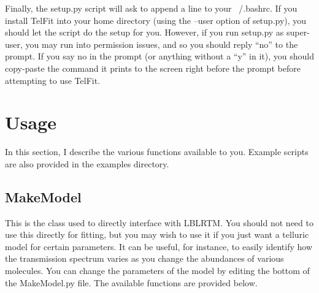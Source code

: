 \documentclass{article}
\begin{document}
Finally, the setup.py script will ask to append a line to your ~/.bashrc. If you install TelFit into your home directory (using the --user option of setup.py), you should let the script do the setup for you. However, if you run setup.py as super-user, you may run into permission issues, and so you should reply ``no'' to the prompt. If you say no in the prompt (or anything without a ``y'' in it), you should copy-paste the command it prints to the screen right before the prompt before attempting to use TelFit. 


\section{Usage}
\label{sec:usage}
In this section, I describe the various functions available to you. Example scripts are also provided in the examples directory. 

\subsection{MakeModel}
\label{subsec:makemodel}
This is the class used to directly interface with LBLRTM. You should not need to use this directly for fitting, but you may wish to use it if you just want a telluric model for certain parameters. It can be useful, for instance, to easily identify how the transmission spectrum varies as you change the abundances of various molecules. You can change the parameters of the model by editing the bottom of the MakeModel.py file. The available functions are provided below.
\end{document}
